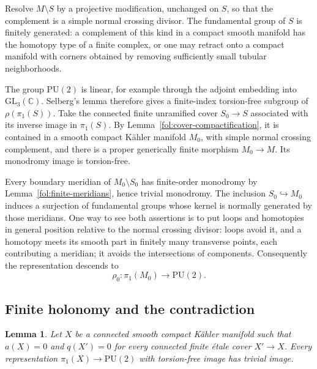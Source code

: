 \documentclass[11pt,letterpaper]{article}
\newcommand{\C}{\mathbb{C}}
\newtheorem{lemma}[theorem]{Lemma}
\theoremstyle{definition}
\theoremstyle{remark}
\begin{document}
Resolve $M\setminus S$ by a projective modification, unchanged on $S$,
so that the complement is a simple normal crossing divisor.
The fundamental group of $S$ is finitely generated: a complement of
this kind in a compact smooth manifold has the homotopy type of a
finite complex, or one may retract onto a compact manifold with
corners obtained by removing sufficiently small tubular neighborhoods.

The group $\mathrm{PU}(2)$ is linear, for example through the adjoint
embedding into $\mathrm{GL}_3(\C)$.  Selberg's lemma therefore gives
a finite-index torsion-free subgroup of $\rho(\pi_1(S))$.
Take the connected finite unramified cover $S_0\to S$ associated with
its inverse image in $\pi_1(S)$.  By
Lemma~\ref{fol:cover-compactification}, it is contained in a smooth
compact K\"ahler manifold $M_0$, with simple normal crossing
complement, and there is a proper generically finite morphism
$M_0\to M$.  Its monodromy image is torsion-free.

Every boundary meridian of $M_0\setminus S_0$ has finite-order
monodromy by Lemma~\ref{fol:finite-meridians}, hence trivial
monodromy.  The inclusion $S_0\hookrightarrow M_0$ induces a
surjection of fundamental groups whose kernel is normally generated
by those meridians.  One way to see both assertions is to put loops
and homotopies in general position relative to the normal crossing
divisor: loops avoid it, and a homotopy meets its smooth part in
finitely many transverse points, each contributing a meridian; it
avoids the intersections of components.  Consequently the
representation descends to
\begin{equation}\label{fol:compact-representation}
 \rho_0\colon\pi_1(M_0)\to\mathrm{PU}(2).
\end{equation}

\subsection{Finite holonomy and the contradiction}

\begin{lemma}\label{fol:finite-unitary-image}
Let $X$ be a connected smooth compact K\"ahler manifold such that
$a(X)=0$ and $q(X')=0$ for every connected finite \'etale cover
$X'\to X$.  Every representation
$\pi_1(X)\to\mathrm{PU}(2)$ with torsion-free image has trivial image.
\end{lemma}
\end{document}
